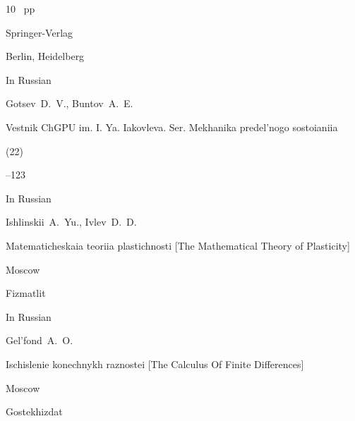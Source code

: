 \begin{thebibliography}{10}
~pp \nofrills

\publ Springer-Verlag 

\publaddr Berlin, Heidelberg









\lang In Russian

\by Gotsev~D.~V., Buntov~A.~E.

\jour Vestnik ChGPU im. I. Ya. Iakovleva. Ser. Mekhanika predel'nogo sostoianiia


 (22)

--123




\lang In Russian

\by Ishlinskii~A.~Yu., Ivlev~D.~D.

\book Matematicheskaia teoriia plastichnosti \rm [The Mathematical Theory of Plasticity]

\publaddr Moscow

\publ Fizmatlit










\lang In Russian

\by Gel'fond~A.~O.

\book Ischislenie konechnykh raznostei \rm [The Calculus Of Finite Differences]

\publaddr Moscow

\publ Gostekhizdat








\end{thebibliography}



\EngDate





\Russian 

\newpage



%

%

% 

%

%

%

%

%

%

%

